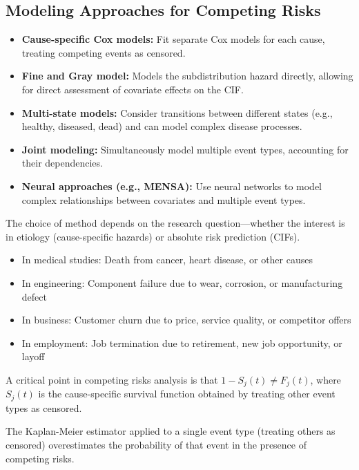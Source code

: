 \subsection{Modeling Approaches for Competing Risks}
\label{subsec:modeling-competing-risks}

\begin{itemize}
    \item \textbf{Cause-specific Cox models:} Fit separate Cox models for each cause, treating competing events as censored.
    
    \item \textbf{Fine and Gray model:} Models the subdistribution hazard directly, allowing for direct assessment of covariate effects on the CIF.
    
    \item \textbf{Multi-state models:} Consider transitions between different states (e.g., healthy, diseased, dead) and can model complex disease processes.
    
    \item \textbf{Joint modeling:} Simultaneously model multiple event types, accounting for their dependencies.
    
    \item \textbf{Neural approaches (e.g., MENSA):} Use neural networks to model complex relationships between covariates and multiple event types.
\end{itemize}

The choice of method depends on the research question—whether the interest is in etiology (cause-specific hazards) or absolute risk prediction (CIFs).

\begin{examplebox}[title=Examples of Competing Risks]
  \begin{itemize}
  \item In medical studies: Death from cancer, heart disease, or other causes
  \item In engineering: Component failure due to wear, corrosion, or manufacturing defect
  \item In business: Customer churn due to price, service quality, or competitor offers
  \item In employment: Job termination due to retirement, new job opportunity, or layoff
  \end{itemize}
\end{examplebox}

\begin{notebox}[title=Important Note on Competing Risks]
A critical point in competing risks analysis is that $1 - S_j(t) \neq F_j(t)$, where $S_j(t)$ is the cause-specific survival function obtained by treating other event types as censored.

The Kaplan-Meier estimator applied to a single event type (treating others as censored) overestimates the probability of that event in the presence of competing risks.
\end{notebox}